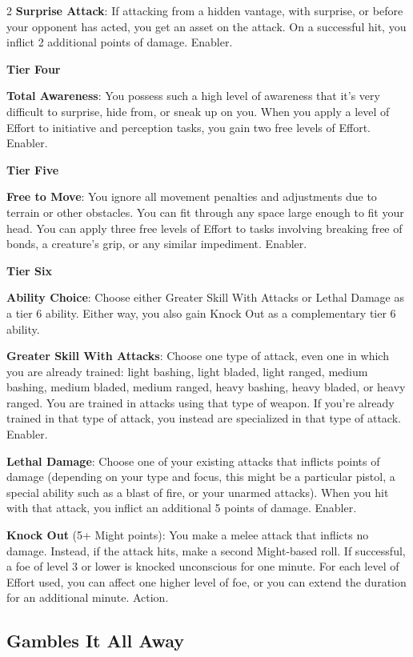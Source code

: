\begin{multicols}{2}
\textbf{Surprise Attack}: If attacking from a hidden vantage, with surprise, or before your opponent has acted, you get an asset on the attack. On a successful hit, you inflict 2 additional points of damage. Enabler. 

\textbf{Tier Four}

\textbf{Total Awareness}: You possess such a high level of awareness that it’s very difficult to surprise, hide from, or sneak up on you. When you apply a level of Effort to initiative and perception tasks, you gain two free levels of Effort. Enabler. 

\textbf{Tier Five}

\textbf{Free to Move}: You ignore all movement penalties and adjustments due to terrain or other obstacles. You can fit through any space large enough to fit your head. You can apply three free levels of Effort to tasks involving breaking free of bonds, a creature’s grip, or any similar impediment. Enabler. 

\textbf{Tier Six}

\textbf{Ability Choice}: Choose either Greater Skill With Attacks or Lethal Damage as a tier 6 ability. Either way, you also gain Knock Out as a complementary tier 6 ability. 

\textbf{Greater Skill With Attacks}: Choose one type of attack, even one in which you are already trained: light bashing, light bladed, light ranged, medium bashing, medium bladed, medium ranged, heavy bashing, heavy bladed, or heavy ranged. You are trained in attacks using that type of weapon. If you’re already trained in that type of attack, you instead are specialized in that type of attack. Enabler. 

\textbf{Lethal Damage}: Choose one of your existing attacks that inflicts points of damage (depending on your type and focus, this might be a particular pistol, a special ability such as a blast of fire, or your unarmed attacks). When you hit with that attack, you inflict an additional 5 points of damage. Enabler. 

\textbf{Knock Out} (5+ Might points): You make a melee attack that inflicts no damage. Instead, if the attack hits, make a second Might-based roll. If successful, a foe of level 3 or lower is knocked unconscious for one minute. For each level of Effort used, you can affect one higher level of foe, or you can extend the duration for an additional minute. Action. 

\subsection{Gambles It All Away} 


\end{multicols}
